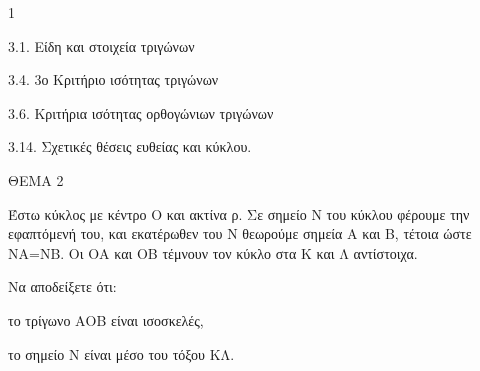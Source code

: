\begin{ylh}{1}
    \item 3.1. Είδη και στοιχεία τριγώνων
    \item 3.4. 3ο Κριτήριο ισότητας τριγώνων
    \item 3.6. Κριτήρια ισότητας ορθογώνιων τριγώνων
    \item 3.14. Σχετικές θέσεις ευθείας και κύκλου.
\end{ylh}

ΘΕΜΑ 2

Έστω κύκλος με κέντρο Ο και ακτίνα ρ. Σε σημείο Ν του κύκλου φέρουμε την εφαπτόμενή του, και εκατέρωθεν του Ν θεωρούμε σημεία Α και Β, τέτοια ώστε ΝΑ=ΝΒ. Οι ΟΑ και ΟΒ τέμνουν τον κύκλο στα Κ και Λ αντίστοιχα.

Να αποδείξετε ότι:

\begin{alist}
\item το τρίγωνο ΑΟΒ είναι ισοσκελές, 

\item το σημείο Ν είναι μέσο του τόξου ΚΛ. 


\begin{center}
\end{center}
\end{alist}
